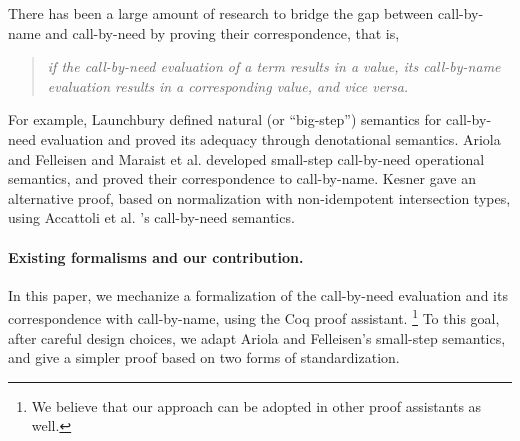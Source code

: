 \documentclass{llncs}
\begin{document}
There has been a large amount of research to bridge the gap between call-by-name and call-by-need by proving their correspondence, that is,
\begin{quote}
\emph{if the call-by-need evaluation of a term results in a value, its call-by-name evaluation results in a corresponding value, and vice versa.}
\end{quote}
For example, Launchbury \cite{Launchbury93} defined natural (or ``big-step'') semantics for call-by-need evaluation and proved its adequacy through denotational semantics.
Ariola and Felleisen \cite{Ariola97} and Maraist et al. \cite{Maraist98} developed small-step call-by-need operational semantics, and proved their correspondence to call-by-name.
Kesner \cite{Kesner16} gave an alternative proof, based on normalization with non-idempotent intersection types, using Accattoli et al. \cite{Accattoli14}'s call-by-need semantics.

\paragraph*{Existing formalisms and our contribution.}
In this paper, we mechanize a formalization of the call-by-need evaluation and its correspondence with call-by-name, using the Coq proof assistant.%
\footnote{We believe that our approach can be adopted in other proof assistants as well.}
To this goal, after careful design choices, we adapt Ariola and Felleisen's small-step semantics, and give a simpler proof based on two forms of standardization.
\end{document}
